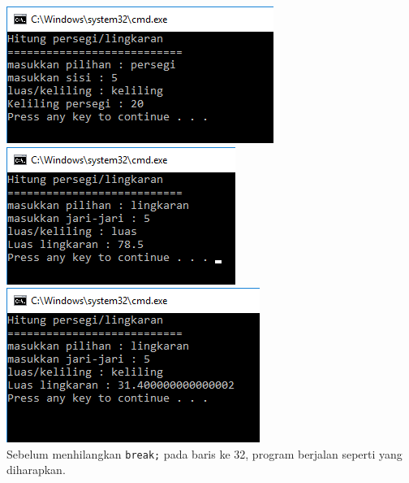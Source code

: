\documentclass[a4paper,12pt]{article}
\begin{document}
\includegraphics[scale=.6]{image--010}\\
\includegraphics[scale=.6]{image--011}
\includegraphics[scale=.6]{image--012}\\
Sebelum menhilangkan \texttt{break;} pada baris ke 32, program berjalan seperti yang diharapkan.
\end{document}

